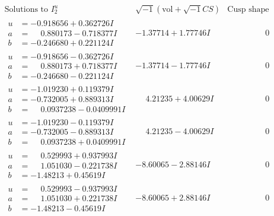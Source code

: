 \documentclass[1p]{elsarticle_modified}
\theoremstyle{definition}
\newcommand{\I}{\sqrt{-1}}
\begin{document}
$$\begin{array}{c|c|c}  
\text{Solutions to }I^u_{2}& \I (\text{vol} + \sqrt{-1}CS) & \text{Cusp shape}\\
 \hline 
\begin{aligned}
u &= -0.918656 + 0.362726 I \\
a &= \phantom{-}0.880173 - 0.718377 I \\
b &= -0.246680 + 0.221124 I\end{aligned}
 & -1.37714 + 1.77746 I & \phantom{-0.000000 } 0 \\ \hline\begin{aligned}
u &= -0.918656 - 0.362726 I \\
a &= \phantom{-}0.880173 + 0.718377 I \\
b &= -0.246680 - 0.221124 I\end{aligned}
 & -1.37714 - 1.77746 I & \phantom{-0.000000 } 0 \\ \hline\begin{aligned}
u &= -1.019230 + 0.119379 I \\
a &= -0.732005 + 0.889313 I \\
b &= \phantom{-}0.0937238 - 0.0409991 I\end{aligned}
 & \phantom{-}4.21235 + 4.00629 I & \phantom{-0.000000 } 0 \\ \hline\begin{aligned}
u &= -1.019230 - 0.119379 I \\
a &= -0.732005 - 0.889313 I \\
b &= \phantom{-}0.0937238 + 0.0409991 I\end{aligned}
 & \phantom{-}4.21235 - 4.00629 I & \phantom{-0.000000 } 0 \\ \hline\begin{aligned}
u &= \phantom{-}0.529993 + 0.937993 I \\
a &= \phantom{-}1.051030 - 0.221738 I \\
b &= -1.48213 + 0.45619 I\end{aligned}
 & -8.60065 - 2.88146 I & \phantom{-0.000000 } 0 \\ \hline\begin{aligned}
u &= \phantom{-}0.529993 - 0.937993 I \\
a &= \phantom{-}1.051030 + 0.221738 I \\
b &= -1.48213 - 0.45619 I\end{aligned}
 & -8.60065 + 2.88146 I & \phantom{-0.000000 } 0 \\ \hline\begin{aligned}

\end{aligned}
\end{array}$$
\end{document}
